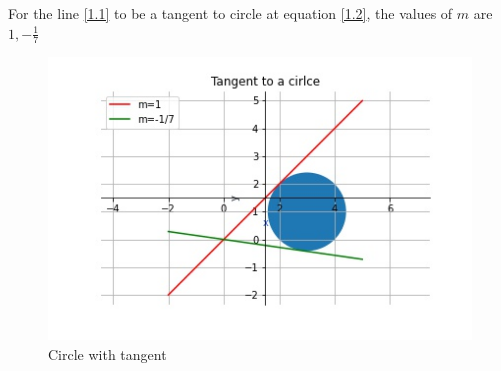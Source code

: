 \documentclass[journal,12pt,twocolumn]{IEEEtran}
\numberwithin{equation}{subsection}
\begin{document}
For the line \ref{1.1} to be a tangent to circle at equation \ref{1.2}, the values of $m$ are $1, -\frac{1}{7}$
\begin{figure}[!]
\includegraphics[width=1\columnwidth]{tangent.jpg}
\caption{Circle with tangent}
\end{figure}
\end{document}
